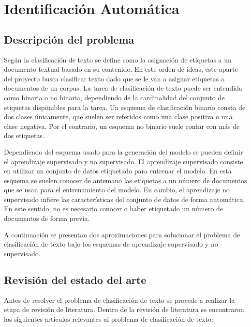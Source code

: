 \section{Identificación Automática}

\subsection{Descripción del problema}
Según \cite{DC_SPRINGER} la clasificación de texto se define como la asignación de etiquetas a un documento textual basado en su contenido. En este orden de ideas, este aparte del proyecto busca clasificar texto dado que se le van a asignar etiquetas a documentos de un corpus. La tarea de clasificación de texto puede ser entendida como binaria o no binaria, dependiendo de la cardinalidad del conjunto de etiquetas disponibles para la tarea. Un esquema de clasificación binario consta de dos clases únicamente, que suelen ser referidos como una clase positiva o una clase negativa. Por el contrario, un esquema no binario suele contar con más de dos etiquetas.

Dependiendo del esquema usado para la generación del modelo se pueden definir el aprendizaje supervisado y no supervisado. El aprendizaje supervisado consiste en utilizar un conjunto de datos etiquetado para entrenar el modelo. En esta esquema se suelen conocer de antemano las etiquetas a un número de documentos que se usan para el entrenamiento del modelo. En cambio, el aprendizaje no supervisado infiere las características del conjunto de datos de forma automática. En este sentido, no es necesario conocer o haber etiquetado un número de documentos de forma previa. 

A continuación se presentan dos aproximaciones para solucionar el problema de clasificación de texto bajo los esquemas de aprendizaje supervisado y no supervisado. 

\subsection{Revisión del estado del arte}
Antes de resolver el problema de clasificación de texto se procede a realizar la etapa de revisión de literatura. Dentro de la revisión de literatura se encontraron los siguientes artículos relevantes al problema de clasificación de texto:

